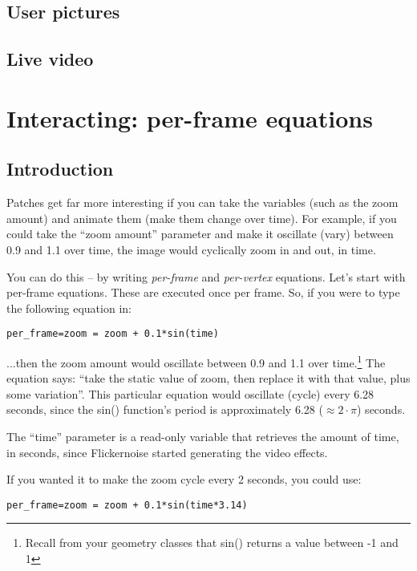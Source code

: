 \documentclass[11pt, a5paper, pagesize]{scrbook}
\begin{document}
\subsection{User pictures}

\subsection{Live video}

\section{Interacting: per-frame equations}
\subsection{Introduction}
Patches get far more interesting if you can take the variables (such as the zoom amount) and animate them (make them change over time). For example, if you could take the ``zoom amount'' parameter and make it oscillate (vary) between 0.9 and 1.1 over time, the image would cyclically zoom in and out, in time.

You can do this -- by writing \textit{per-frame} and \textit{per-vertex} equations. Let's start with per-frame equations. These are executed once per frame. So, if you were to type the following equation in:

\begin{verbatim}
per_frame=zoom = zoom + 0.1*sin(time)
\end{verbatim}


...then the zoom amount would oscillate between 0.9 and 1.1 over time.\footnote{Recall from your geometry classes that sin() returns a value between -1 and 1} The equation says: ``take the static value of zoom, then replace it with that value, plus some variation''. This particular equation would oscillate (cycle) every 6.28 seconds, since the sin() function's period is approximately 6.28 ($\approx 2 \cdot \pi$) seconds.

The ``time'' parameter is a read-only variable that retrieves the amount of time, in seconds, since Flickernoise started generating the video effects.

If you wanted it to make the zoom cycle every 2 seconds, you could use:

\begin{verbatim}
per_frame=zoom = zoom + 0.1*sin(time*3.14)
\end{verbatim}
\end{document}
